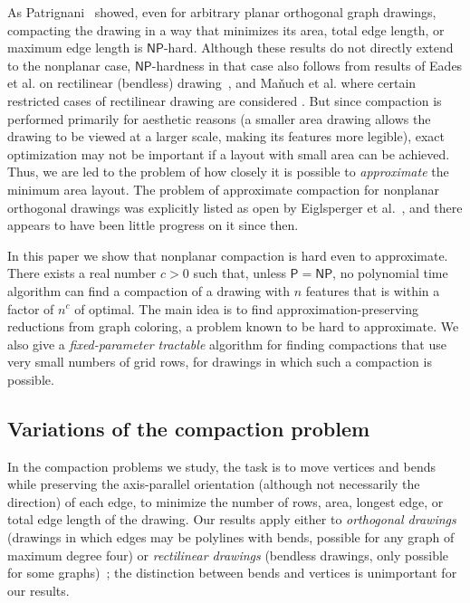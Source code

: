 \documentclass[12pt]{article}
\theoremstyle{definitions}
\renewcommand{\P}{\mathsf{P}}
\newcommand{\NP}{\mathsf{NP}}
\begin{document}
As Patrignani~\cite{Patrignani:1999} showed, even for arbitrary planar orthogonal graph drawings, compacting the drawing in a way that minimizes its area, total edge length, or maximum edge length is $\NP$-hard. Although these results do not directly extend to the nonplanar case, $\NP$-hardness in that case also follows from results of Eades et al. on rectilinear (bendless) drawing~\cite{Eades:2010}, and Ma{\v{n}}uch et al. where certain restricted cases of rectilinear drawing are considered \cite{Manuch:2011}.
But since compaction is performed primarily for aesthetic reasons (a smaller area drawing allows the drawing to be viewed at a larger scale, making its features more legible), exact optimization may not be important if a layout with small area can be achieved. Thus, we are led to the problem of how closely it is possible to \emph{approximate} the minimum area layout.
The problem of approximate compaction for nonplanar orthogonal drawings was explicitly listed as open by Eiglsperger et al.~\cite{Eiglsperger:2001}, and there appears to have been little progress on it since then.

In this paper we show that nonplanar compaction is hard even to approximate.
There exists a real number $c>0$ such that, unless $\P=\NP$, no polynomial time
algorithm can find a compaction of a drawing with $n$ features that is within a
factor of $n^c$ of optimal. The main idea is to find approximation-preserving
reductions from graph coloring, a problem known to be hard to approximate. We
also give a \emph{fixed-parameter tractable} algorithm for finding compactions 
that use very small numbers of grid rows, for drawings in which such a compaction is possible.

\subsection{Variations of the compaction problem}

In the compaction problems we study, the task is to move vertices and bends
while preserving the axis-parallel orientation (although not necessarily the
direction) of each edge, to minimize the number of rows, area, longest edge,
or total edge length of the
drawing. Our results apply either to \emph{orthogonal drawings} (drawings in
which edges may be polylines with bends, possible for any graph of maximum
degree four) or \emph{rectilinear drawings} (bendless drawings,  only
possible for some graphs)~\cite{Eades:2010,Eppstein:2009}; the distinction
between bends and vertices is unimportant for our results.
\end{document}
